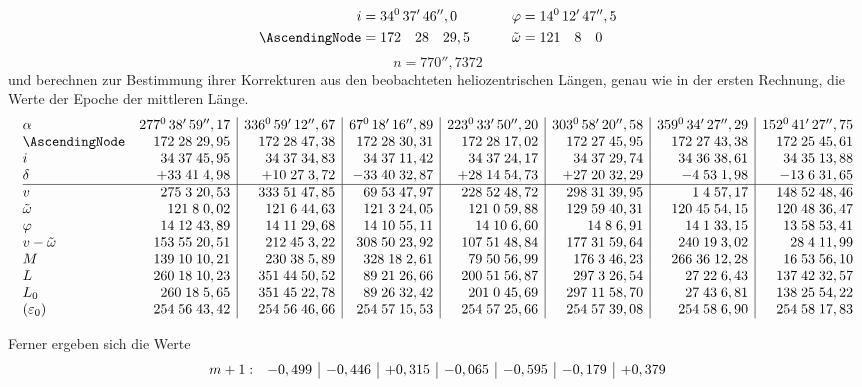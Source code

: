 \begin{landscape}
\[\begin{aligned}
i&=34^0\,37'\,46'',0&\qquad\varphi&=14^0\,12'\,47'',5\\
\AscendingNode&=172\quad28\quad29,5&\tilde\omega&=121\quad8\quad0
\end{aligned}\]
\[n=770'',7372\]
und berechnen zur Bestimmung ihrer Korrekturen aus den beobachteten heliozentrischen Längen, genau \hypertarget{native-493-cont}{}\label{native-493-cont}wie in der ersten Rechnung, die Werte der Epoche der mittleren Länge.
\begingroup\small
\[\begin{array}{@{}l r|r|r|r|r|r|r@{}}
\alpha&277^0\,38'\,59'',17&336^0\,59'\,12'',67&67^0\,18'\,16'',89&223^0\,33'\,50'',20&303^0\,58'\,20'',58&359^0\,34'\,27'',29&152^0\,41'\,27'',75\\
\AscendingNode&172\;28\;29,95&172\;28\;47,38&172\;28\;30,31&172\;28\;17,02&172\;27\;45,95&172\;27\;43,38&172\;25\;45,61\\
i&34\;37\;45,95&34\;37\;34,83&34\;37\;11,42&34\;37\;24,17&34\;37\;29,74&34\;36\;38,61&34\;35\;13,88\\
\delta&+33\;41\;4,98&+10\;27\;3,72&-33\;40\;32,87&+28\;14\;54,73&+27\;20\;32,29&-4\;53\;1,98&-13\;6\;31,65\\
\hline
v&275\;3\;20,53&333\;51\;47,85&69\;53\;47,97&228\;52\;48,72&298\;31\;39,95&1\;4\;57,17&148\;52\;48,46\\
\tilde\omega&121\;8\;0,02&121\;6\;44,63&121\;3\;24,05&121\;0\;59,88&129\;59\;40,31&120\;45\;54,15&120\;48\;36,47\\
\varphi&14\;12\;43,89&14\;11\;29,68&14\;10\;55,11&14\;10\;6,60&14\;8\;6,91&14\;1\;33,15&13\;58\;53,41\\
v-\tilde\omega&153\;55\;20,51&212\;45\;3,22&308\;50\;23,92&107\;51\;48,84&177\;31\;59,64&240\;19\;3,02&28\;4\;11,99\\
M&139\;10\;10,21&230\;38\;5,89&328\;18\;2,61&79\;50\;56,99&176\;3\;46,23&266\;36\;12,28&16\;53\;56,10\\
L&260\;18\;10,23&351\;44\;50,52&89\;21\;26,66&200\;51\;56,87&297\;3\;26,54&27\;22\;6,43&137\;42\;32,57\\
L_0&260\;18\;5,65&351\;45\;22,78&89\;26\;32,42&201\;0\;45,69&297\;11\;58,70&27\;43\;6,81&138\;25\;54,22\\
(\varepsilon_0)&254\;56\;43,42&254\;56\;46,66&254\;57\;15,53&254\;57\;25,66&254\;57\;39,08&254\;58\;6,90&254\;58\;17,83
\end{array}\]
\endgroup
\par
Ferner ergeben sich die Werte
\[\begin{array}{@{}r r|r|r|r|r|r|r@{}}
m+1:&-0,499&-0,446&+0,315&-0,065&-0,595&-0,179&+0,379\\

\end{array}\]
\end{landscape}
